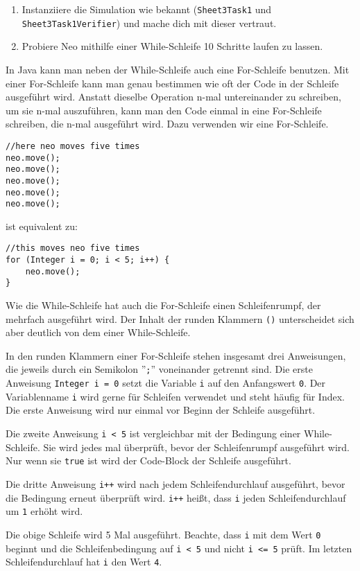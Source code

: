 
\begin{enumerate}
	\item Instanziiere die Simulation wie bekannt (\lstinline{Sheet3Task1} und \lstinline{Sheet3Task1Verifier}) und mache dich mit dieser vertraut.
	\item Probiere Neo mithilfe einer While-Schleife 10 Schritte laufen zu lassen.\\
	
\end{enumerate}


\begin{Infobox}
	In Java kann man neben der While-Schleife auch eine For-Schleife benutzen.
	Mit einer For-Schleife kann man genau bestimmen wie oft der Code in der Schleife ausgeführt wird.
	Anstatt dieselbe Operation n-mal untereinander zu schreiben, um sie n-mal auszuführen, kann man den Code einmal in eine For-Schleife schreiben, die n-mal ausgeführt wird.
	Dazu verwenden wir eine For-Schleife. 

	\begin{lstlisting}[numbers=none]
//here neo moves five times
neo.move();
neo.move();
neo.move();
neo.move();
neo.move();
	\end{lstlisting}
	
	ist equivalent zu:

	\begin{lstlisting}[numbers=none]
//this moves neo five times
for (Integer i = 0; i < 5; i++) {
	neo.move();
}
	\end{lstlisting}

	Wie die While-Schleife hat auch die For-Schleife einen Schleifenrumpf, der mehrfach ausgeführt wird.
	Der Inhalt der runden Klammern \lstinline{()} unterscheidet sich aber deutlich von dem einer While-Schleife.

	In den runden Klammern einer For-Schleife stehen insgesamt drei Anweisungen, die jeweils durch ein Semikolon ''\lstinline{;}'' voneinander getrennt sind.
	Die erste Anweisung \lstinline{Integer i = 0} setzt die Variable \lstinline{i} auf den Anfangswert \lstinline{0}.
	Der Variablenname \lstinline{i} wird gerne für Schleifen verwendet und steht häufig für Index.
	Die erste Anweisung wird nur einmal vor Beginn der Schleife ausgeführt.
	
	Die zweite Anweisung \lstinline{i < 5} ist vergleichbar mit der Bedingung einer While-Schleife.
	Sie wird jedes mal überprüft, bevor der Schleifenrumpf ausgeführt wird.
	Nur wenn sie \lstinline{true} ist wird der Code-Block der Schleife ausgeführt.

	Die dritte Anweisung \lstinline{i++} wird nach jedem Schleifendurchlauf ausgeführt, bevor die Bedingung erneut überprüft wird.
	\lstinline{i++} heißt, dass \lstinline{i} jeden Schleifendurchlauf um \lstinline{1} erhöht wird. 
	
	Die obige Schleife wird 5 Mal ausgeführt.
	Beachte, dass \lstinline{i} mit dem Wert \lstinline{0} beginnt und die Schleifenbedingung auf \lstinline{i < 5} und nicht \lstinline{i <= 5} prüft.
	Im letzten Schleifendurchlauf hat \lstinline{i} den Wert \lstinline{4}.
\end{Infobox}


